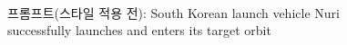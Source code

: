 \documentclass[
  letterpaper,
]{book}
\begin{document}
\begin{figure}

\begin{minipage}[t]{0.49\linewidth}

{\centering 


\caption{프롬프트(스타일 적용 전): South Korean launch vehicle Nuri
successfully launches and enters its target orbit}

}

\end{minipage}%
%
\begin{minipage}[t]{0.02\linewidth}

{\centering 

~

}

\end{minipage}%
%
\begin{minipage}[t]{0.49\linewidth}

{\centering 

\raisebox{-\height}{

}}
\end{minipage}
\end{figure}
\end{document}

